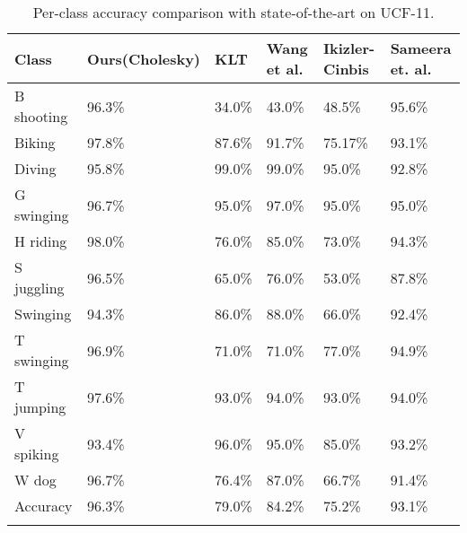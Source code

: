 \begin{table*}[]
\centering
\begin{tabular}{|l||l|l|l|l|l|}
\hline
Class            & Ours(Cholesky) & KLT\cite{lucas1981iterative} & Wang et al.\cite{wang2011action} & Ikizler-Cinbis\cite{ikizler2010object} & Sameera et. al.\cite{7486474} \\ \hline  \hline
B shooting       & 96.3\%    &  34.0\%   &  43.0\%   & 48.5\%    &   95.6\%  \\ 
Biking           & 97.8\%    &  87.6\%   &  91.7\%   & 75.17\%    &  93.1\%   \\ 
Diving           & 95.8\%    &  99.0\%   &  99.0\%   & 95.0\%    &   92.8\%  \\ 
G swinging       & 96.7\%    &  95.0\%   &  97.0\%   & 95.0\%    &   95.0\%  \\ 
H riding         & 98.0\%    &  76.0\%   &  85.0\%   & 73.0\%    &   94.3\%  \\ 
S juggling       & 96.5\%    &  65.0\%   &  76.0\%   & 53.0\%    &   87.8\%  \\ 
Swinging         & 94.3\%    &  86.0\%   &  88.0\%   & 66.0\%    &   92.4\%  \\ 
T swinging       & 96.9\%    &  71.0\%   &  71.0\%   & 77.0\%    &   94.9\%  \\ 
T jumping        & 97.6\%    &  93.0\%   &  94.0\%   & 93.0\%    &   94.0\%  \\ 
V spiking        & 93.4\%    &  96.0\%   &  95.0\%   & 85.0\%    &   93.2\%  \\ 
W dog            & 96.7\%    &  76.4\%   &  87.0\%   & 66.7\%    &   91.4\%  \\ \hline \hline
Accuracy &  96.3\%   &  79.0\%   &  84.2\%   & 75.2\%    &   93.1\%  \\ \hline
\label{tbl:per-action ucf}
\end{tabular}
\caption{Per-class accuracy comparison with state-of-the-art on UCF-11.}
\end{table*}

